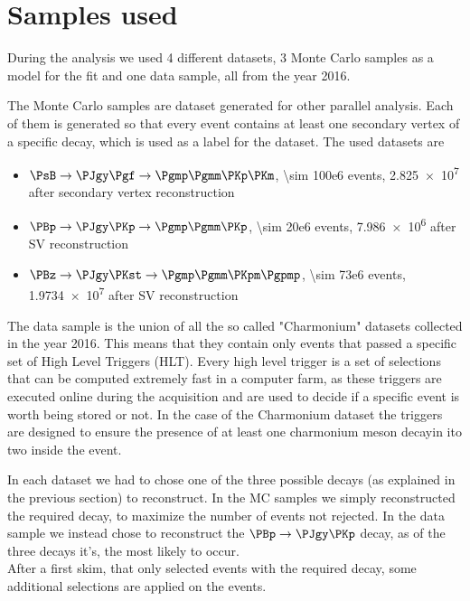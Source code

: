 \section{Samples used}
\label{sec:data}

During the analysis we used 4 different datasets, 3 Monte Carlo samples as a model for the fit and one data sample, all from the year 2016.

The Monte Carlo samples are dataset generated for other parallel analysis.
Each of them is generated so that every event contains at least one secondary vertex of a specific decay, which is used as a label for the dataset.
The used datasets are
\begin{itemize}
	\item $\PsB\to\PJgy\Pgf\to\Pgmp\Pgmm\PKp\PKm$, \num{\sim 100e6} events, \num{2.825e7} after secondary vertex reconstruction
	\item $\PBp\to\PJgy\PKp\to\Pgmp\Pgmm\PKp$, \num{\sim 20e6} events, \num{7.986e6} after SV reconstruction
	\item $\PBz\to\PJgy\PKst\to\Pgmp\Pgmm\PKpm\Pgpmp$, \num{\sim 73e6} events, \num{1.9734e7} after SV reconstruction
\end{itemize}

The data sample is the union of all the so called "Charmonium" datasets collected in the year 2016.
This means that they contain only events that passed a specific set of High Level Triggers (HLT).
Every high level trigger is a set of selections that can be computed extremely fast in a computer farm, as these triggers are executed online during the acquisition and are used to decide if a specific event is worth being stored or not.
In the case of the Charmonium dataset the triggers are designed to ensure the presence of at least one charmonium meson decayin ito two \Pgm inside the event.

In each dataset we had to chose one of the three possible decays (as explained in the previous section) to reconstruct.
In the MC samples we simply reconstructed the required decay, to maximize the number of events not rejected.
In the data sample we instead chose to reconstruct the $\PBp\to\PJgy\PKp$ decay, as of the three decays it's, the most likely to occur.\\

After a first skim, that only selected events with the required decay, some additional selections are applied on the events.

